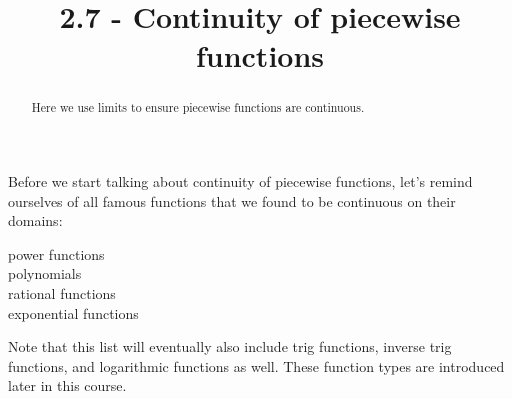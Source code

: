 \documentclass{ximera}
\title{2.7 - Continuity of piecewise functions}
\begin{document}
\begin{abstract}
Here we use limits to ensure piecewise functions are continuous.
\end{abstract}
\maketitle
Before we start talking about continuity of piecewise functions, let's remind ourselves of all famous functions that we found to be continuous on their domains:

power functions
\\polynomials
\\rational functions
\\exponential functions





Note that this list will eventually also include trig functions, inverse trig functions, and logarithmic functions as well. These function types are introduced later in this course.
\end{document}
